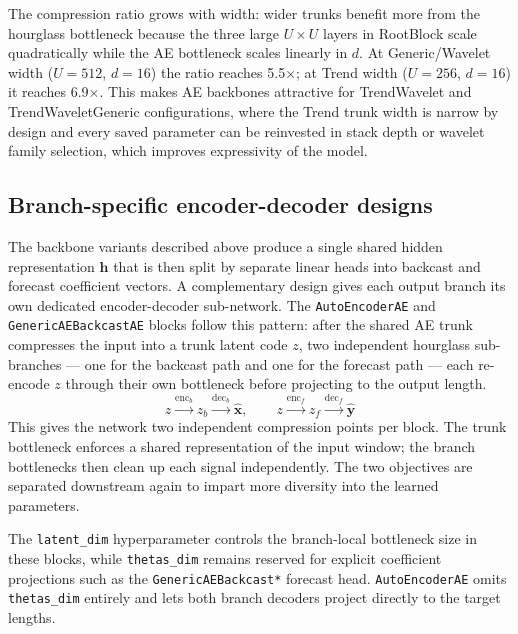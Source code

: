\documentclass{article}
\begin{document}
The compression ratio grows with width: wider trunks benefit more from the hourglass bottleneck because the three large $U \times U$ layers in RootBlock scale quadratically while the AE bottleneck scales linearly in $d$. At Generic/Wavelet width ($U = 512$, $d = 16$) the ratio reaches 5.5$\times$; at Trend width ($U = 256$, $d = 16$) it reaches 6.9$\times$. This makes AE backbones attractive for TrendWavelet and TrendWaveletGeneric configurations, where the Trend trunk width is narrow by design and every saved parameter can be reinvested in stack depth or wavelet family selection, which improves expressivity of the model.

\subsection{Branch-specific encoder-decoder designs}

The backbone variants described above produce a single shared hidden representation $\mathbf{h}$ that is then split by separate linear heads into backcast and forecast coefficient vectors. A complementary design gives each output branch its own dedicated encoder-decoder sub-network. The \texttt{AutoEncoderAE} and \texttt{GenericAEBackcastAE} blocks follow this pattern: after the shared AE trunk compresses the input into a trunk latent code $z$, two independent hourglass sub-branches --- one for the backcast path and one for the forecast path --- each re-encode $z$ through their own bottleneck before projecting to the output length.
\begin{equation*}
z \xrightarrow{\text{enc}_b} z_b \xrightarrow{\text{dec}_b} \hat{\mathbf{x}}, \qquad z \xrightarrow{\text{enc}_f} z_f \xrightarrow{\text{dec}_f} \hat{\mathbf{y}}
\end{equation*}
This gives the network two independent compression points per block. The trunk bottleneck enforces a shared representation of the input window; the branch bottlenecks then clean up each signal independently. The two objectives are separated downstream again to impart more diversity into the learned parameters.

The \texttt{latent\_dim} hyperparameter controls the branch-local bottleneck size in these blocks, while \texttt{thetas\_dim} remains reserved for explicit coefficient projections such as the \texttt{GenericAEBackcast*} forecast head. \texttt{AutoEncoderAE} omits \texttt{thetas\_dim} entirely and lets both branch decoders project directly to the target lengths.
\end{document}
